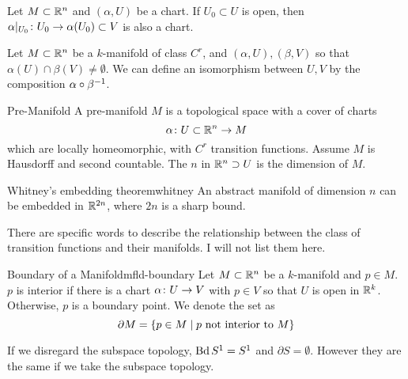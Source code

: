 \documentclass{article}
\begin{document}
\begin{lemma}{}{}
  Let $M \subset \RR[n]$ and $(\alpha, U)$ be a chart.
  If $U_{0} \subset U$ is open, then $\alpha|_{U_{0}} \from U_{0} \to \alpha(U_{0}) \subset V$ is also a chart.
\end{lemma}

\begin{theorem}{}{}
  Let $M \subset \RR[n]$ be a $k$-manifold of class $C^{r}$,
  and $(\alpha, U), (\beta, V)$ so that $\alpha(U) \cap \beta(V) \ne \emptyset$.
  We can define an isomorphism between $U, V$ by the composition $\alpha \circ \beta\inv$.
\end{theorem}

\begin{definition}{Pre-Manifold}{}
  A pre-manifold $M$ is a topological space with a cover of charts
  \[ \alpha \from U \subset \RR[n] \to M \]
  which are locally homeomorphic, with $C^{r}$ transition functions.
  Assume $M$ is Hausdorff and second countable.
  The $n$ in $\RR[n] \supset U$ is the dimension of $M$.
\end{definition}

\begin{theorem}{Whitney's embedding theorem}{whitney}
  An abstract manifold of dimension $n$ can be embedded
  in $\RR[2n]$, where $2n$ is a sharp bound.
\end{theorem}

There are specific words to describe the relationship between
the class of transition functions and their manifolds.
I will not list them here.

\begin{definition}{Boundary of a Manifold}{mfld-boundary}
  Let $M \subset \RR[n]$ be a $k$-manifold and $p \in M$.
  $p$ is interior if there is a chart $\alpha \from U \to V$ with $p \in V$
  so that $U$ is open in $\RR[k]$.
  Otherwise, $p$ is a boundary point.
  We denote the set as
  \[ \partial M = \set*{ p \in M \mid p \text{ not interior to } M } \]
\end{definition}

If we disregard the subspace topology, $\Bd S^{1} = S^{1}$ and $\partial S = \emptyset$.
However they are the same if we take the subspace topology.
\end{document}
